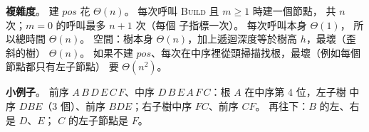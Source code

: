 \begin{pastsoln}
\textbf{複雜度}。 建 $\mathit{pos}$ 花 $\Theta(n)$。 每次呼叫 \textsc{Build} 且 $m \ge 1$ 時建一個節點，
共 $n$ 次；$m = 0$ 的呼叫最多 $n + 1$ 次（每個 \NIL 子指標一次）。 每次呼叫本身 $\Theta(1)$，
所以總時間 $\Theta(n)$。 空間：樹本身 $\Theta(n)$，加上遞迴深度等於樹高 $h$，最壞（歪斜的樹）
$\Theta(n)$。 如果不建 $\mathit{pos}$、每次在中序裡從頭掃描找根，最壞（例如每個節點都只有左子節點）
要 $\Theta(n^2)$。

\textbf{小例子}。 前序 $A\,B\,D\,E\,C\,F$、中序 $D\,B\,E\,A\,F\,C$：根 $A$ 在中序第 4 位，左子樹
中序 $DBE$（3 個）、前序 $BDE$；右子樹中序 $FC$、前序 $CF$。 再往下：$B$ 的左、右是 $D$、$E$；
$C$ 的左子節點是 $F$。
\end{pastsoln}
